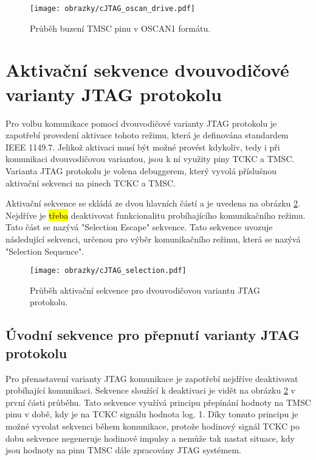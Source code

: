\begin{figure}[!h]
  \begin{center}
    \texttt{[image: obrazky/cJTAG\_oscan\_drive.pdf]}
  \end{center}
  \caption{Průběh buzení \acs{TMSC} pinu v OSCAN1 formátu.}
	\label{fig:oscan_drive}
\end{figure}


\section{Aktivační sekvence dvouvodičové varianty \acs{JTAG} protokolu}
Pro volbu komunikace pomocí dvouvodičové varianty \acs{JTAG} protokolu je zapotřebí provedení aktivace tohoto režimu, která je definována standardem IEEE 1149.7. Jelikož aktivaci musí být možné provést kdykoliv, tedy i při komunikaci dvouvodičovou variantou, jsou k ní využity piny \acs{TCKC} a \acs{TMSC}. Varianta \acs{JTAG} protokolu je volena debuggerem, který vyvolá příslušnou aktivační sekvenci na pinech \acs{TCKC} a \acs{TMSC}. \cite{IEEE_1149-7}

Aktivační sekvence se skládá ze dvou hlavních částí a je uvedena na obrázku \ref{fig:cJTAG_sel}. Nejdříve je \hl{třeba} deaktivovat funkcionalitu probíhajícího komunikačního režimu. Tato část se nazývá "Selection Escape" sekvence. Tato sekvence uvozuje následující sekvenci, určenou pro výběr komunikačního režimu, která se nazývá "Selection Sequence". \cite{IEEE_1149-7}

\begin{figure}[!h]
  \begin{center}
    \texttt{[image: obrazky/cJTAG\_selection.pdf]}
  \end{center}
  \caption{Průběh aktivační sekvence pro dvouvodičovou variantu \acs{JTAG} protokolu.}
	\label{fig:cJTAG_sel}
\end{figure}

\subsection{Úvodní sekvence pro přepnutí varianty \acs{JTAG} protokolu}	\label{subsec:sel_escape}
Pro přenastavení varianty \acs{JTAG} komunikace je zapotřebí nejdříve deaktivovat probíhající komunikaci. Sekvence sloužící k deaktivaci je vidět na obrázku \ref{fig:cJTAG_sel} v první části průběhu. Tato sekvence využívá principu přepínání hodnoty na \acs{TMSC} pinu v době, kdy je na \acs{TCKC} signálu hodnota log. 1. Díky tomuto principu je možné vyvolat sekvenci během komunikace, protože hodinový signál \acs{TCKC} po dobu sekvence negeneruje hodinové impulsy a nemůže tak nastat situace, kdy jsou hodnoty na pinu \acs{TMSC} dále zpracovány \acs{JTAG} systémem. \cite{IEEE_1149-7}

